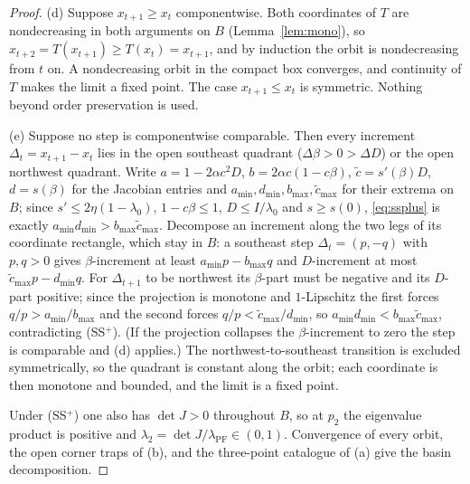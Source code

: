 \documentclass[11pt]{article}
\theoremstyle{definition}
\theoremstyle{remark}
\numberwithin{equation}{section}
\begin{document}
\begin{proof}
(d) Suppose $x_{t+1} \ge x_t$ componentwise. Both coordinates of $T$ are nondecreasing in both arguments on $B$ (Lemma~\ref{lem:mono}), so $x_{t+2} = T(x_{t+1}) \ge T(x_t) = x_{t+1}$, and by induction the orbit is nondecreasing from $t$ on. A nondecreasing orbit in the compact box converges, and continuity of $T$ makes the limit a fixed point. The case $x_{t+1} \le x_t$ is symmetric. Nothing beyond order preservation is used.

(e) Suppose no step is componentwise comparable. Then every increment $\Delta_t = x_{t+1}-x_t$ lies in the open southeast quadrant ($\Delta\beta>0>\Delta D$) or the open northwest quadrant. Write $a = 1-2\alpha c^2 D$, $b = 2\alpha c(1-c\beta)$, $\tilde c = s'(\beta)D$, $d = s(\beta)$ for the Jacobian entries and $a_{\min}, d_{\min}, b_{\max}, \tilde c_{\max}$ for their extrema on $B$; since $s' \le 2\eta(1-\lambda_0)$, $1-c\beta \le 1$, $D \le I/\lambda_0$ and $s \ge s(0)$, \eqref{eq:ssplus} is exactly $a_{\min}d_{\min} > b_{\max}\tilde c_{\max}$. Decompose an increment along the two legs of its coordinate rectangle, which stay in $B$: a southeast step $\Delta_t = (p,-q)$ with $p,q>0$ gives $\beta$-increment at least $a_{\min}p - b_{\max}q$ and $D$-increment at most $\tilde c_{\max}p - d_{\min}q$. For $\Delta_{t+1}$ to be northwest its $\beta$-part must be negative and its $D$-part positive; since the projection is monotone and $1$-Lipschitz the first forces $q/p > a_{\min}/b_{\max}$ and the second forces $q/p < \tilde c_{\max}/d_{\min}$, so $a_{\min}d_{\min} < b_{\max}\tilde c_{\max}$, contradicting (SS$^+$). (If the projection collapses the $\beta$-increment to zero the step is comparable and (d) applies.) The northwest-to-southeast transition is excluded symmetrically, so the quadrant is constant along the orbit; each coordinate is then monotone and bounded, and the limit is a fixed point.

Under (SS$^+$) one also has $\det J > 0$ throughout $B$, so at $p_2$ the eigenvalue product is positive and $\lambda_2 = \det J/\lambda_{\mathrm{PF}} \in (0,1)$. Convergence of every orbit, the open corner traps of (b), and the three-point catalogue of (a) give the basin decomposition.


\end{proof}
\end{document}

